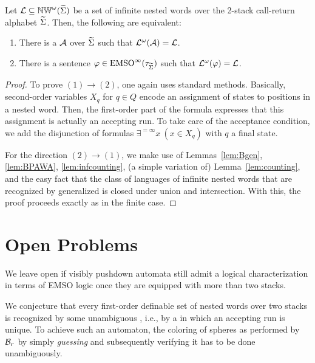 \documentclass{LMCS}
\begin{document}
\begin{thm}
  Let $\mathcal{L} \mathrel{\subseteq} \mathbb{NW}^\omega(\widetilde{\Sigma})$ be a set of infinite nested
  words over the 2-stack call-return alphabet $\widetilde{\Sigma}$. Then, the following
  are equivalent:
\begin{enumerate}[\em(1)]
\item There is a \Buchi \tVPA $\mathcal{A}$ over $\widetilde{\Sigma}$ such that
  $\mathcal{L}^\omega(\mathcal{A}) = \mathcal{L}$.
\item There is a sentence $\varphi \in \textup{EMSO}^\infty(\tau_{\widetilde{\Sigma}})$ such that
  $\mathcal{L}^\omega(\varphi) = \mathcal{L}$.
\end{enumerate}
\end{thm}

\begin{proof}
  To prove $(1) \rightarrow (2)$, one again uses standard methods. Basically,
  second-order variables $X_q$ for $q \in Q$ encode an assignment of states to
  positions in a nested word. Then, the first-order part of the formula
  expresses that this assignment is actually an accepting run. To take care of
  the acceptance condition, we add the disjunction of formulas
  $\exists^{=\infty} x~(x \in X_q)$ with $q$ a final state.

  For the direction $(2) \rightarrow (1)$, we make use of
  Lemmas~\ref{lem:Bgen}, \ref{lem:BPAWA}, \ref{lem:infcounting}, (a simple
  variation of) Lemma~\ref{lem:counting}, and the easy fact that the class of
  languages of infinite nested words that are recognized by generalized \Buchi
  \tNWA is closed under union and intersection. With this, the proof proceeds
  exactly as in the finite case.
\end{proof}



\section{Open Problems}\label{sec:openproblems}

We leave open if visibly pushdown automata still admit a logical
characterization in terms of EMSO logic once they are equipped with more than
two stacks.

We conjecture that every first-order definable set of nested words over two
stacks is recognized by some unambiguous \tVPA, i.e., by a \tVPA in which an
accepting run is unique. To achieve such an automaton, the coloring of spheres
as performed by $\mathcal{B}_r$ by simply \emph{guessing} and subsequently
verifying it has to be done unambiguously.
\end{document}
